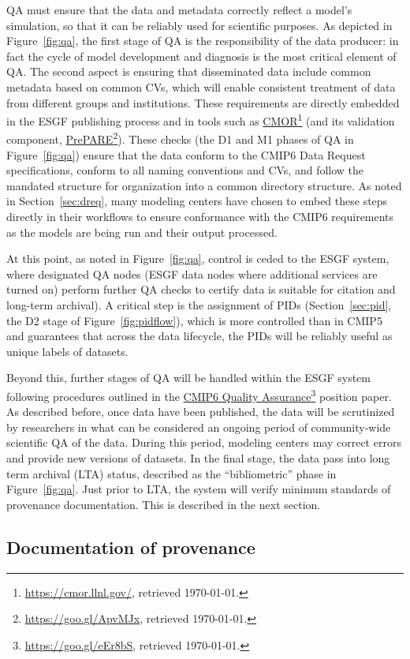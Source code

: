 \documentclass[gmd,manuscript]{copernicus}
\newcommand{\pllabel}[1]{\label{p-#1}\linelabel{l-#1}}
\newcommand{\urlref}[2] {\href{#1}{#2}\footnote{\url{#1}, retrieved \today.}}
\begin{document}
QA must ensure that the data and metadata correctly reflect a model's
simulation, so that it can be reliably used for scientific purposes.
As depicted in Figure~\ref{fig:qa}, the first stage of QA is the
responsibility of the data producer: in fact the cycle of model
development and diagnosis is the most critical element of QA. The
second aspect is ensuring that disseminated data include common
metadata based on common CVs, which will enable consistent treatment
of data from different groups and institutions. These requirements are
directly embedded in the ESGF publishing process and in tools such as
\urlref{https://cmor.llnl.gov/}{CMOR} (and its validation component,
\urlref{https://goo.gl/ApvMJx}{PrePARE}). These checks (the D1 and M1
phases of QA in Figure~\ref{fig:qa}) ensure that the data conform to
the CMIP6 Data Request specifications, conform to all naming
conventions and CVs, and follow the mandated structure for
organization into a common directory structure. As noted in
Section~\ref{sec:dreq}, many modeling centers have chosen to embed
these steps directly in their workflows to ensure conformance with the
CMIP6 requirements as the models are being run and their output processed.

At this point, as noted in Figure~\ref{fig:qa}, control is ceded to
the ESGF system, where designated QA nodes 
\pllabel{RC1-51}
(ESGF data nodes where additional services are turned on) 
perform further QA checks to certify data is suitable 
 for citation and long-term archival). 
 A critical step is the assignment of PIDs
(Section~\ref{sec:pid}, the D2 stage of Figure~\ref{fig:pidflow}),
which is more controlled than in CMIP5 and guarantees that across the
data lifecycle, the PIDs will be reliably useful as unique labels of
datasets.

Beyond this, further stages of QA will be handled within the ESGF
system following procedures outlined in the
\urlref{https://goo.gl/eEr8bS}{CMIP6 Quality Assurance} position
paper. As described before, once data have been published, the data
will be scrutinized by researchers in what can be considered an
ongoing period of community-wide scientific QA of the data. During
this period, modeling centers may correct errors and provide new
versions of datasets. In the final stage, the data pass into long term
archival (LTA) status, described as the ``bibliometric'' phase in
Figure~\ref{fig:qa}. Just prior to LTA, the system will verify minimum
standards of provenance documentation. This is described in the next
section.

\subsection{Documentation of provenance}
\label{sec:doc}
\end{document}
